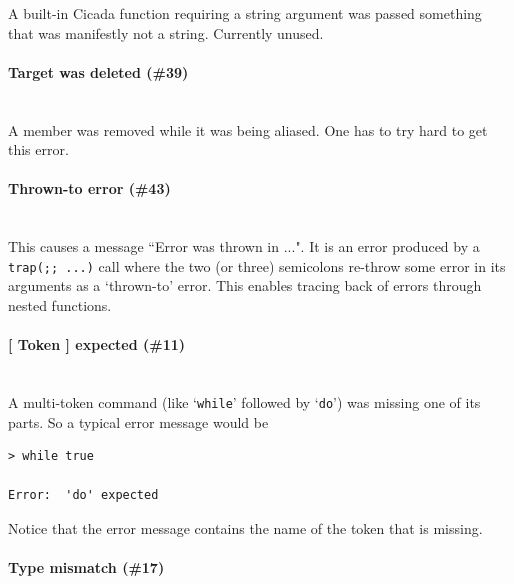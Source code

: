 \documentclass{article}
\newenvironment{code}{
       \begin{list}{}{
               \setlength{\leftmargin}{.4in}
               \setlength{\rightmargin}{0in}
               \setlength{\topsep}{.2in}
       }
       \small
       \item[] }
       { \end{list}   }
\begin{document}
A built-in Cicada function requiring a string argument was passed something that was manifestly not a string.  Currently unused.\\




\paragraph{Target was deleted (\#39)\\\\}

A member was removed while it was being aliased.  One has to try hard to get this error.\\




\paragraph{Thrown-to error (\#43)\\\\}

This causes a message ``Error was thrown in ...".  It is an error produced by a \verb#trap(;; ...)# call where the two (or three) semicolons re-throw some error in its arguments as a `thrown-to' error.  This enables tracing back of errors through nested functions.\\




\paragraph{[ Token ] expected (\#11)\\\\}

A multi-token command (like `\verb#while#' followed by `\verb#do#') was missing one of its parts.  So a typical error message would be

\begin{code} \begin{verbatim}
> while true

Error:  'do' expected
\end{verbatim} \end{code}

\noindent Notice that the error message contains the name of the token that is missing.\\





\paragraph{Type mismatch (\#17)\\\\}
\end{document}
